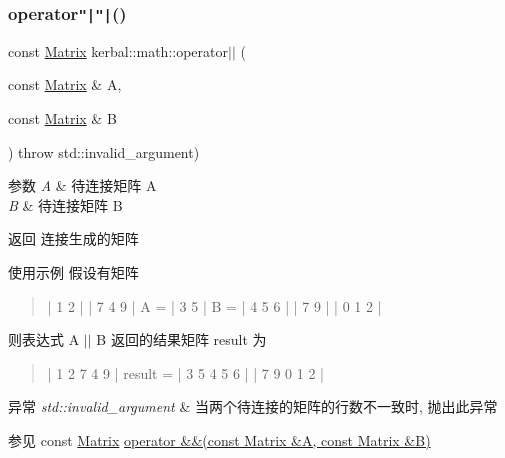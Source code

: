 \subsubsection{\texorpdfstring{operator\texttt{"|}\texttt{"|}()}{operator||()}}
{\footnotesize\ttfamily const \hyperlink{classkerbal_1_1math_1_1_matrix}{Matrix} kerbal\+::math\+::operator$\vert$$\vert$ (\begin{DoxyParamCaption}\item[{const \hyperlink{classkerbal_1_1math_1_1_matrix}{Matrix} \&}]{A,  }\item[{const \hyperlink{classkerbal_1_1math_1_1_matrix}{Matrix} \&}]{B }\end{DoxyParamCaption}) throw  std\+::invalid\+\_\+argument) }


\begin{DoxyParams}{参数}
{\em A} & 待连接矩阵 A \\
\hline
{\em B} & 待连接矩阵 B \\
\hline
\end{DoxyParams}
\begin{DoxyReturn}{返回}
连接生成的矩阵 
\end{DoxyReturn}
\begin{DoxyParagraph}{使用示例}
假设有矩阵~\newline
\begin{quote}
\begin{DoxyVerb}    | 1 2 |         | 7 4 9 |
A = | 3 5 |     B = | 4 5 6 |
    | 7 9 |         | 0 1 2 |
\end{DoxyVerb}


\end{quote}
则表达式 A $\vert$$\vert$ B 返回的结果矩阵 result 为~\newline
\begin{quote}
\begin{DoxyVerb}         | 1 2 7 4 9 |
result = | 3 5 4 5 6 |
         | 7 9 0 1 2 |
\end{DoxyVerb}


\end{quote}

\end{DoxyParagraph}

\begin{DoxyExceptions}{异常}
{\em std\+::invalid\+\_\+argument} & 当两个待连接的矩阵的行数不一致时, 抛出此异常 \\
\hline
\end{DoxyExceptions}
\begin{DoxySeeAlso}{参见}
const \hyperlink{classkerbal_1_1math_1_1_matrix}{Matrix} \hyperlink{namespacekerbal_1_1math_aee54e09d15f9889c9faddb862e0d6930}{operator \&\&(const Matrix \&\+A, const Matrix \&\+B)} 
\end{DoxySeeAlso}
\mbox{\label{namespacekerbal_1_1math_a86b959cd43a4fe7ed04f513d67189acd}} 
